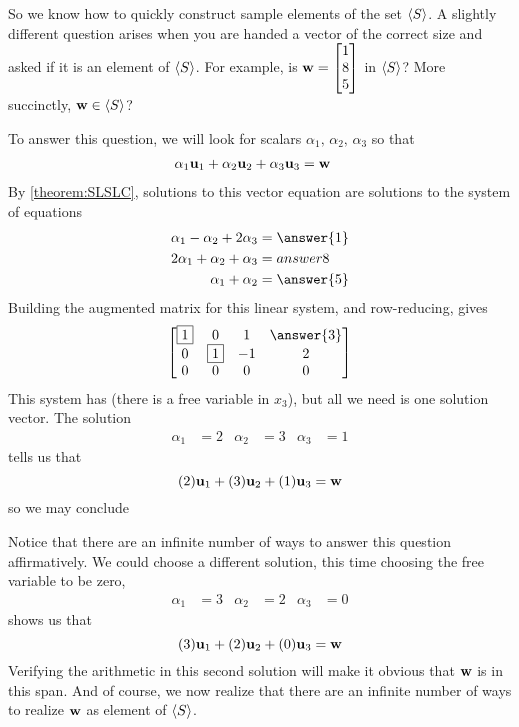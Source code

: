 \documentclass{ximera}
\begin{document}
\begin{example}
  \begin{question}
    So we know how to quickly construct sample elements of the set
    $\left\langle S\right\rangle$.  A slightly different question arises when you are
    handed a vector of the correct size and asked if it is an element
    of $\left\langle S\right\rangle$.  For example, is $\mathbf{w}=\begin{bmatrix}1\\8\\5\end{bmatrix}$ in
    $\left\langle S\right\rangle$?  More succinctly, $\mathbf{w}\in\left\langle S\right\rangle$?

    To answer this question, we will look for scalars
    $\alpha_1,\,\alpha_2,\,\alpha_3$ so that
    \begin{align*}
      \alpha_1\mathbf{u}_1+\alpha_2\mathbf{u}_2+\alpha_3\mathbf{u}_3&=\mathbf{w}
    \end{align*}
    By \ref{theorem:SLSLC}, solutions to this vector equation are
    solutions to the system of equations
    \begin{align*}
      \alpha_1-\alpha_2+2\alpha_3&=\answer{1}\\
      2\alpha_1+\alpha_2+\alpha_3&=answer{8}\\
      \alpha_1+\alpha_2&=\answer{5}
    \end{align*}
    Building the augmented matrix for this linear system, and row-reducing, gives
    \[
      \begin{bmatrix}
        \leading{1} & 0 & 1 & \answer{3}\\
        0 & \leading{1} & -1 & 2\\
        0 & 0 & 0 & 0
      \end{bmatrix}
    \]
    This system has  (there is a free
    variable in $x_3$), but all we need is one solution vector.  The
    solution
    \begin{align*}
      \alpha_1 &= 2
      &
        \alpha_2 &= 3
      &
        \alpha_3 &= 1
    \end{align*}
    tells us that
    \[
      (2)\mathbf{u}_1+(3)\mathbf{u}_2+(1)\mathbf{u}_3=\mathbf{w}
    \]
    so we may conclude
    \begin{multipleChoice}
    \end{multipleChoice} 
    
    Notice that there are an infinite number of ways to answer this
    question affirmatively.  We could choose a different solution,
    this time choosing the free variable to be zero,
    \begin{align*}
      \alpha_1 &= 3
      &
        \alpha_2 &= 2
      &
        \alpha_3 &= 0
    \end{align*}
    shows us that
    \[
      (3)\mathbf{u}_1+(2)\mathbf{u}_2+(0)\mathbf{u}_3=\mathbf{w}
    \]
    Verifying the arithmetic in this second solution will make it
    obvious that $\mathbf{w}$ is in this span.  And of course, we now
    realize that there are an infinite number of ways to realize
    $\mathbf{w}$ as element of $\left\langle S\right\rangle$.
  \end{question}


\end{example}
\end{document}
